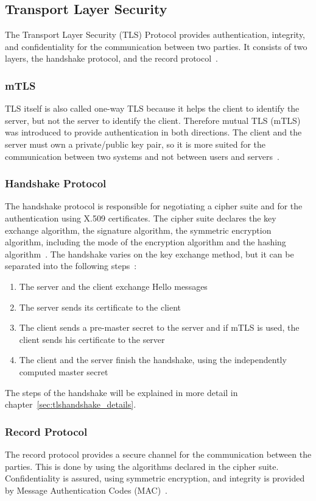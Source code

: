 \subsection{Transport Layer Security}
The Transport Layer Security (TLS) Protocol provides authentication, integrity, and confidentiality for the communication between two parties.
It consists of two layers, the handshake protocol, and the record protocol~\cite{turnertls}.

\subsubsection{mTLS} \label{sec:mtls}
TLS itself is also called one-way TLS because it helps the client to identify the server, but not the server to identify the client.
Therefore mutual TLS (mTLS) was introduced to provide authentication in both directions.
The client and the server must own a private/public key pair, so it is more suited for the communication between two systems and not between users and servers~\cite{dias2020microservices}. 

\subsubsection{Handshake Protocol}
The handshake protocol is responsible for negotiating a cipher suite and for the authentication using X.509 certificates.
The cipher suite declares the key exchange algorithm, the signature algorithm, the symmetric encryption algorithm, including the mode of the encryption algorithm and the hashing algorithm~\cite{turnertls, kurbatov2021design}.
The handshake varies on the key exchange method, but it can be separated into the following steps~\cite{krawczyk2013security}:
\begin{enumerate}
    \item The server and the client exchange Hello messages
    \item The server sends its certificate to the client
    \item The client sends a pre-master secret to the server and if mTLS is used, the client sends his certificate to the server
    \item The client and the server finish the handshake, using the independently computed master secret
\end{enumerate}
The steps of the handshake will be explained in more detail in chapter~\ref{sec:tlshandshake_details}.

\subsubsection{Record Protocol}
The record protocol provides a secure channel for the communication between the parties.
This is done by using the algorithms declared in the cipher suite.
Confidentiality is assured, using symmetric encryption, and integrity is provided by Message Authentication Codes (MAC)~\cite{kurbatov2021design, krawczyk2013security}.

